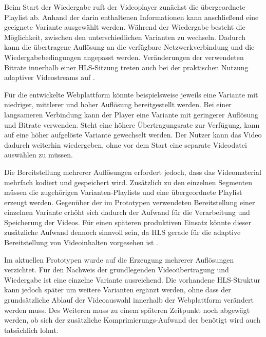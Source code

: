 Beim Start der Wiedergabe ruft der Videoplayer zunächst die übergeordnete Playlist ab. Anhand der darin enthaltenen Informationen kann anschließend eine geeignete Variante ausgewählt werden. Während der Wiedergabe besteht die Möglichkeit, zwischen den unterschiedlichen Varianten zu wechseln. 
Dadurch kann die übertragene Auflösung an die verfügbare Netzwerkverbindung und die Wiedergabebedingungen angepasst werden. Veränderungen der verwendeten Bitrate innerhalb einer HLS-Sitzung treten auch bei der praktischen Nutzung adaptiver Videostreams auf \cite{10.1145/2068816.2068829}. 

Für die entwickelte Webplattform könnte beispielsweise jeweils eine Variante mit niedriger, mittlerer und hoher Auflösung bereitgestellt werden. Bei einer langsameren Verbindung kann der Player eine Variante mit geringerer Auflösung und Bitrate verwenden. Steht eine höhere Übertragungsrate zur Verfügung, 
kann auf eine höher aufgelöste Variante gewechselt werden. Der Nutzer kann das Video dadurch weiterhin wiedergeben, ohne vor dem Start eine separate Videodatei auswählen zu müssen. 

Die Bereitstellung mehrerer Auflösungen erfordert jedoch, dass das Videomaterial mehrfach kodiert und gespeichert wird. Zusätzlich zu den einzelnen Segmenten müssen die zugehörigen Varianten-Playlists und eine übergeordnete Playlist erzeugt werden. 
Gegenüber der im Prototypen verwendeten Bereitstellung einer einzelnen Variante erhöht sich dadurch der Aufwand für die Verarbeitung und Speicherung der Videos. Für einen späteren produktiven Einsatz könnte dieser zusätzliche Aufwand dennoch sinnvoll sein, 
da HLS gerade für die adaptive Bereitstellung von Videoinhalten vorgesehen ist \cite{Saini2026}. 

Im aktuellen Prototypen wurde auf die Erzeugung mehrerer Auflösungen verzichtet. Für den Nachweis der grundlegenden Videoübertragung und Wiedergabe ist eine einzelne Variante ausreichend. Die vorhandene HLS-Struktur kann jedoch später um weitere Varianten ergänzt werden, 
ohne dass der grundsätzliche Ablauf der Videoauswahl innerhalb der Webplattform verändert werden muss. Des Weiteren muss zu einem späteren Zeitpunkt noch abgewägt werden, ob sich der zusätzliche Komprimierungs-Aufwand der benötigt wird auch tatsächlich lohnt.

\newpage